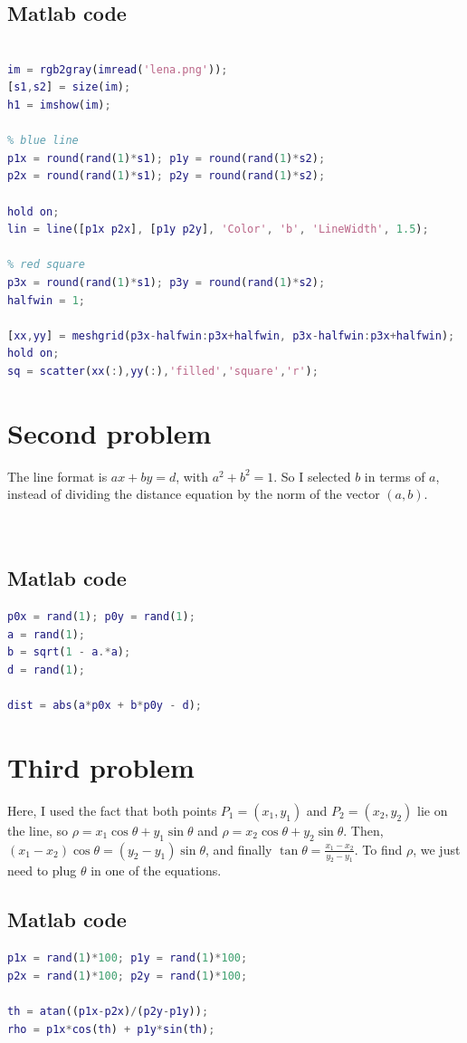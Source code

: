\documentclass{article}
\begin{document}
\subsection{Matlab code}
\begin{lstlisting}[language=Matlab]

im = rgb2gray(imread('lena.png'));
[s1,s2] = size(im);
h1 = imshow(im);

% blue line
p1x = round(rand(1)*s1); p1y = round(rand(1)*s2);
p2x = round(rand(1)*s1); p2y = round(rand(1)*s2);

hold on;
lin = line([p1x p2x], [p1y p2y], 'Color', 'b', 'LineWidth', 1.5);

% red square
p3x = round(rand(1)*s1); p3y = round(rand(1)*s2);
halfwin = 1;

[xx,yy] = meshgrid(p3x-halfwin:p3x+halfwin, p3x-halfwin:p3x+halfwin);
hold on;
sq = scatter(xx(:),yy(:),'filled','square','r');


\end{lstlisting}

\vspace{1pc}
\section{Second problem}

The line format is $ax + by = d$, with $a^2 + b^2 = 1$. So I selected $b$ in terms of $a$, instead of dividing the distance equation by the norm of the vector $(a,b)$.
\\
\\
\\
\subsection{Matlab code}
\begin{lstlisting}[language=Matlab]
p0x = rand(1); p0y = rand(1);
a = rand(1);
b = sqrt(1 - a.*a);
d = rand(1);

dist = abs(a*p0x + b*p0y - d);
\end{lstlisting}

\vspace{1pc}
\section{Third problem}

Here, I used the fact that both points $P_1 = (x_1,y_1)$ and $P_2 = (x_2,y_2)$ lie on the line, so $\rho = x_1\cos{\theta} + y_1\sin{\theta}$ and  $\rho = x_2\cos{\theta} + y_2\sin{\theta}$. Then, $(x_1 - x_2)\cos{\theta} = (y_2 - y_1)\sin{\theta}$, and finally $\tan{\theta} = \frac{x_1-x_2}{y_2-y_1}$. To find $\rho$, we just need to plug $\theta$ in one of the equations.

\subsection{Matlab code}
\begin{lstlisting}[language=Matlab]
p1x = rand(1)*100; p1y = rand(1)*100;
p2x = rand(1)*100; p2y = rand(1)*100;

th = atan((p1x-p2x)/(p2y-p1y));
rho = p1x*cos(th) + p1y*sin(th);
\end{lstlisting}
\end{document}
